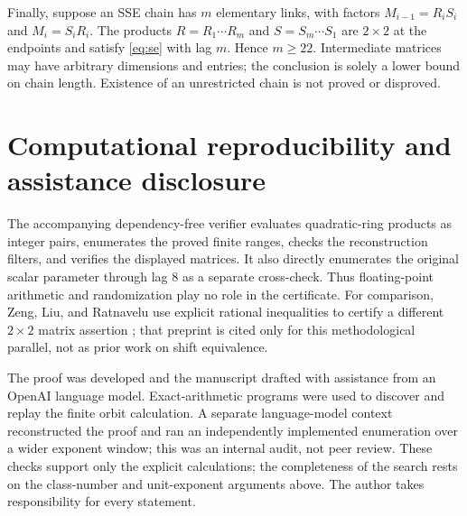 \documentclass[11pt]{article}
\begin{document}
Finally, suppose an SSE chain has $m$ elementary links, with factors
$M_{i-1}=R_iS_i$ and $M_i=S_iR_i$.  The products
$R=R_1\cdots R_m$ and $S=S_m\cdots S_1$ are $2\times2$ at the endpoints and
satisfy \eqref{eq:se} with lag $m$.  Hence $m\geq22$.  Intermediate matrices
may have arbitrary dimensions and entries; the conclusion is solely a lower
bound on chain length.  Existence of an unrestricted chain is not proved or
disproved.

\section*{Computational reproducibility and assistance disclosure}

The accompanying dependency-free verifier evaluates quadratic-ring products
as integer pairs, enumerates the proved finite ranges, checks the reconstruction
filters, and verifies the displayed matrices.  It also directly enumerates the
original scalar parameter through lag $8$ as a separate cross-check.  Thus
floating-point arithmetic and randomization play no role in the certificate.
For comparison, Zeng, Liu, and Ratnavelu use explicit rational inequalities to
certify a different $2\times2$ matrix assertion
\cite{ZengLiuRatnavelu2026}; that preprint is cited only for this
methodological parallel, not as prior work on shift equivalence.

The proof was developed and the manuscript drafted with assistance from an
OpenAI language model.  Exact-arithmetic programs were used to discover and
replay the finite orbit calculation.  A separate language-model context
reconstructed the proof and ran an independently implemented enumeration over
a wider exponent window; this was an internal audit, not peer review.  These
checks support only the explicit calculations; the completeness of the search
rests on the class-number and unit-exponent arguments above.  The author takes
responsibility for every statement.

\begingroup
\small


\endgroup
\end{document}
